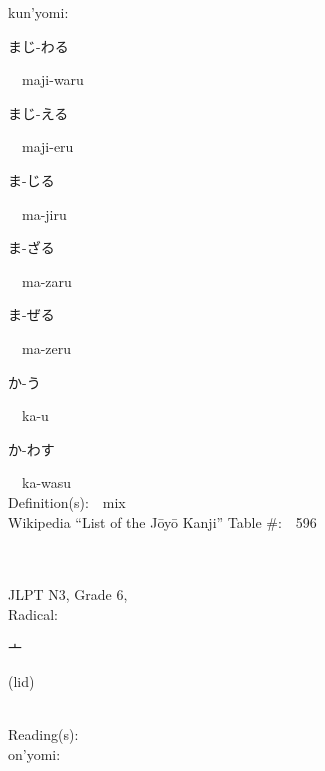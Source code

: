 \begin{multicols}{2}
{\hspace*{1em}}kun'yomi:\ \ \\
{\hspace*{2em}}{\begin{CJK}{UTF8}{min} まじ-わる \end{CJK}}\ \ maji-waru\ \ \\
{\hspace*{2em}}{\begin{CJK}{UTF8}{min} まじ-える \end{CJK}}\ \ maji-eru\ \ \\
{\hspace*{2em}}{\begin{CJK}{UTF8}{min} ま-じる \end{CJK}}\ \ ma-jiru\ \ \\
{\hspace*{2em}}{\begin{CJK}{UTF8}{min} ま-ざる \end{CJK}}\ \ ma-zaru\ \ \\
{\hspace*{2em}}{\begin{CJK}{UTF8}{min} ま-ぜる \end{CJK}}\ \ ma-zeru\ \ \\
{\hspace*{2em}}{\begin{CJK}{UTF8}{min} か-う \end{CJK}}\ \ ka-u\ \ \\
{\hspace*{2em}}{\begin{CJK}{UTF8}{min} か-わす \end{CJK}}\ \ ka-wasu\ \ \\
Definition(s):\ \ mix \\
Wikipedia ``List of the J\=oy\=o Kanji'' Table \#:\ \ 596 \\
\ \ \\
{\fontsize{34pt}{40pt}  }\ \ \\  %
{JLPT N3, Grade 6, \\Radical:\ \ {\begin{CJK}{UTF8}{min} 亠 \end{CJK}} (lid) } \\
Reading(s):\ \ \\
{\hspace*{1em}}on'yomi:\ \ \\

\end{multicols}
